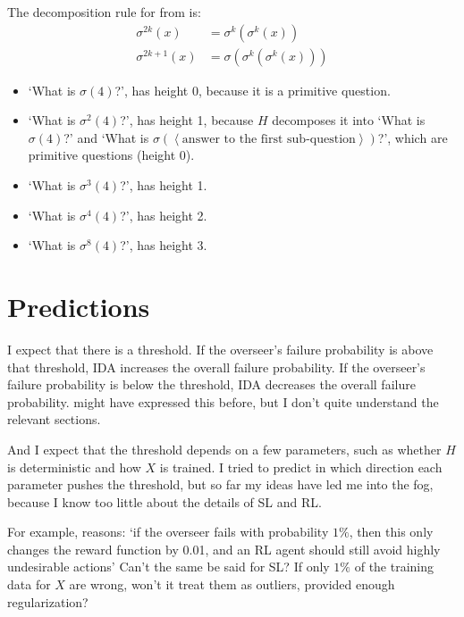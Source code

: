 \documentclass{farlamp}
\begin{document}
\begin{example}
    The decomposition rule for  from \textcite[table
    3]{CSASupAmp} is:
    \begin{align}
        \sigma^{2k}(x) &= \sigma^k(\sigma^k(x)) \\
        \sigma^{2k+1}(x) &= \sigma(\sigma^k(\sigma^k(x)))
    \end{align}

    \begin{itemize}
        \item ‘What is $\sigma(4)$?’, has height 0, because it is a primitive
            question.
        \item ‘What is $\sigma^2(4)$?’, has height 1, because $H$ decomposes it
            into ‘What is $\sigma(4)$?’ and ‘What is $\sigma(\left<\text{answer
            to the first sub-question}\right>)$?’, which are primitive questions
            (height 0).
        \item ‘What is $\sigma^3(4)$?’, has height 1.
        \item ‘What is $\sigma^4(4)$?’, has height 2.
        \item ‘What is $\sigma^8(4)$?’, has height 3.
    \end{itemize}
\end{example}


\section{Predictions}
\label{sec:prediction}

I expect that there is a threshold. If the overseer's failure probability is
above that threshold, IDA increases the overall failure probability. If the
overseer's failure probability is below the threshold, IDA decreases the overall
failure probability. \textcite{ChriRelAmp} might have expressed this before, but
I don't quite understand the relevant sections.

And I expect that the threshold depends on a few parameters, such as whether $H$
is deterministic and how $X$ is trained. I tried to predict in which direction
each parameter pushes the threshold, but so far my ideas have led me into the
fog, because I know too little about the details of SL and RL.

For example, \textcite{ChriRelAmp} reasons: ‘if the overseer fails with
probability $1 \%$, then this only changes the reward function by 0.01, and an
RL agent should still avoid highly undesirable actions’ Can't the same be said
for SL? If only $1 \%$ of the training data for $X$ are wrong, won't it treat
them as outliers, provided enough regularization?
\end{document}
